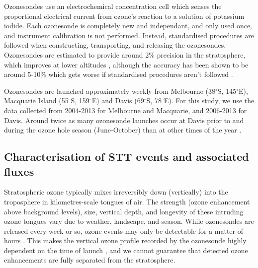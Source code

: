 \documentclass{article}
\begin{document}
    Ozonesondes use an electrochemical concentration cell which senses the proportional electrical current from ozone's reaction to a solution of potassium iodide.
    Each ozonesonde is completely new and independant, and only used once, and instrument calibration is not performed.
    Instead, standardised procedures are followed when constructing, transporting, and releasing the ozonesondes.
    Ozonesondes are estimated to provide around 2\% precision in the stratosphere, which improves at lower altitudes \citep{noaasondes}, although the accuracy has been shown to be around 5-10\% which gets worse if standardised procedures aren't followed \citep{Smit2007}.
    
    Ozonesondes are launched approximately weekly from Melbourne (38$^{\circ}$S, 145$^{\circ}$E), Macquarie Island (55$^{\circ}$S, 159$^{\circ}$E) and Davis (69$^{\circ}$S, 78$^{\circ}$E). 
    For this study, we use the data collected from 2004-2013 for Melbourne and Macquarie, and 2006-2013 for Davis. 
    Around twice as many ozonesonde launches occur at Davis prior to and during the ozone hole season (June-October) than at other times of the year \citep{Alexander2013}.
    

  \subsection{Characterisation of STT events and associated fluxes}
    \label{Section:CharacterisationOfSTTs}
    
    Stratospheric ozone typically mixes irreversibly down (vertically) into the troposphere in kilometres-scale tongues of air.
    The strength (ozone enhancement above background levels), size, vertical depth, and longevity of these intruding ozone tongues vary due to weather, landscape, and season.
    While ozonesondes are released every week or so, ozone events may only be detectable for a matter of hours \citep{Tang2012}.
    This makes the vertical ozone profile recorded by the ozonesonde highly dependent on the time of launch \citep{Sprenger2003}, and we cannot guarantee that detected ozone enhancements are fully separated from the stratosphere.
    
\end{document}

